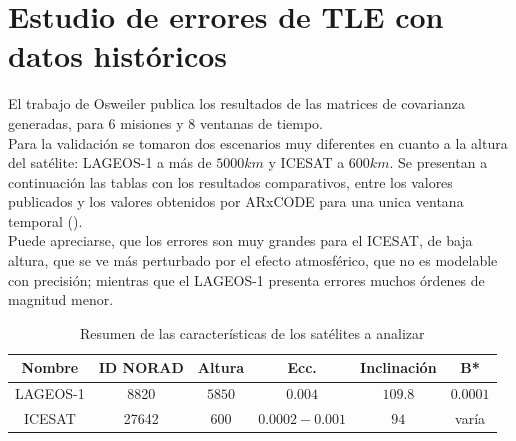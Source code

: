 \begin{table}[!h]
\centering
{}
\caption{Resultados del Systems Tool Kit (STK) propagando el mismo TLE que ARxCODE.}
\end{table}



\section{Estudio de errores de TLE con datos hist\'oricos}

El trabajo de Osweiler publica los resultados de las matrices de covarianza generadas, para 6 misiones y 8 ventanas de tiempo.\\
Para la validaci\'on se tomaron dos escenarios muy diferentes en cuanto a la altura del sat\'elite: LAGEOS-1 a m\'as de $5000 km$ y ICESAT a $600 km$.
Se presentan a continuaci\'on las tablas con los resultados comparativos, entre los valores publicados y los valores obtenidos por ARxCODE para una unica ventana temporal (\textcolor{resto de las comparaciones en Appedice}).\\
Puede apreciarse, que los errores son muy grandes para el ICESAT, de baja altura, que se ve m\'as perturbado por el efecto atmosf\'erico, que no es modelable con precisión; mientras que el LAGEOS-1 presenta errores muchos \'ordenes de magnitud menor.\\

\begin{table}
 \centering
      \begin{tabular}{cccccc}
      \hline
      Nombre & ID NORAD & Altura & Ecc. & Inclinaci\'on & B* \\
      \hline
      LAGEOS-1 & 8820 & $5850$ & $0.004$ & $109.8$ & $0.0001$ \\
      ICESAT & 27642 & $600$ & $0.0002 - 0.001$ & $94$ & var\'ia \\
      \hline
      \end{tabular}
    \caption[Sat\'elites de Estudio]{Resumen de las caracter\'isticas de los sat\'elites a analizar}
\end{table}

